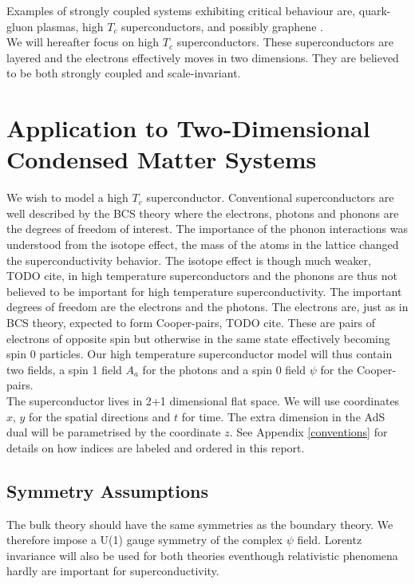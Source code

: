 \documentclass[12pt]{report}
\begin{document}
Examples of strongly coupled systems exhibiting critical behaviour are, quark-gluon plasmas\cite{PhysRevD.73.045013}, high $T_c$ superconductors\cite{hartnoll8}, and possibly graphene \cite{hartnoll8}.\\

We will hereafter focus on high $T_c$ superconductors. These superconductors are layered and the electrons effectively moves in two dimensions. They are believed to be both strongly coupled and scale-invariant\cite{hartnoll8}.

\chapter{Application to Two-Dimensional Condensed Matter Systems}
We wish to model a high $T_c$ superconductor. Conventional superconductors are well described by the BCS theory where the electrons, photons and phonons are the degrees of freedom of interest. The importance of the phonon interactions was understood from the isotope effect, the mass of the atoms in the lattice changed the superconductivity behavior. The isotope effect is though much weaker, TODO cite, in high temperature superconductors and the phonons are thus not believed to be important for high temperature superconductivity. The important degrees of freedom are the electrons and the photons. The electrons are, just as in BCS theory, expected to form Cooper-pairs, TODO cite. These are pairs of electrons of opposite spin but otherwise in the same state effectively becoming spin 0 particles. Our high temperature superconductor model will thus contain two fields, a spin 1 field $A_a$ for the photons and a spin 0 field $\psi$ for the Cooper-pairs.\\

The superconductor lives in 2+1 dimensional flat space. We will use coordinates $x$, $y$ for the spatial directions and $t$ for time. The extra dimension in the AdS dual will be parametrised by the coordinate $z$. See Appendix \ref{conventions} for details on how indices are labeled and ordered in this report. 
\section{Symmetry Assumptions}
The bulk theory should have the same symmetries as the boundary theory. We therefore impose a U(1) gauge symmetry of the complex $\psi$ field. Lorentz invariance will also be used for both theories eventhough relativistic phenomena hardly are important for superconductivity.
\end{document}

